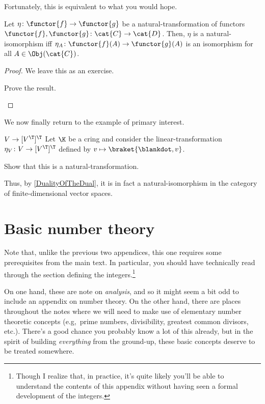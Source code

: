 Fortunately, this is equivalent to what you would hope.
\begin{prp}{}{}
	Let $\eta \colon \functor{f}\rightarrow \functor{g}$ be a natural-transformation of functors $\functor{f},\functor{g}\colon \cat{C}\rightarrow \cat{D}$.  Then, $\eta$ is a natural-isomorphism iff $\eta _A\colon \functor{f}(A)\rightarrow \functor{g}(A)$ is an isomorphism for all $A\in \Obj (\cat{C})$.
	\begin{proof}
		We leave this as an exercise.
		\begin{exr}[breakable=false]{}{}
			Prove the result.
		\end{exr}
	\end{proof}
\end{prp}

We now finally return to the example of primary interest.
\begin{exm}{$V\rightarrow [V^{\T}]^{\T}$}{}
	Let $\K$ be a cring and consider the linear-transformation $\eta _V\colon V\rightarrow [V^{\T}]^{\T}$ defined by $v\mapsto \braket{\blankdot ,v}$.
	\begin{exr}[breakable=false]{}{}
		Show that this is a natural-transformation.
	\end{exr}
	Thus, by \cref{DualityOfTheDual}, it is in fact a natural-isomorphism in the category of finite-dimensional vector spaces.
\end{exm}

\cleardoublepage
\chapter{Basic number theory}

Note that, unlike the previous two appendices, this one requires some prerequisites from the main text.  In particular, you should have technically read through the section defining the integers.\footnote{Though I realize that, in practice, it's quite likely you'll be able to understand the contents of this appendix without having seen a formal development of the integers.}

On one hand, these are note on \emph{analysis}, and so it might seem a bit odd to include an appendix on number theory.  On the other hand, there are places throughout the notes where we will need to make use of elementary number theoretic concepts (e.g,~prime numbers, divisibility, greatest common divisors, etc.).  There's a good chance you probably know a lot of this already, but in the spirit of building \emph{everything} from the ground-up, these basic concepts deserve to be treated somewhere. 

